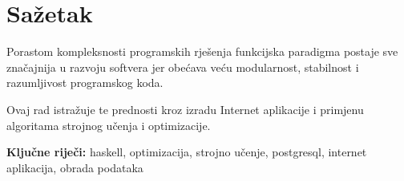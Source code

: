 \chapter*{Sažetak}
Porastom kompleksnosti programskih rješenja funkcijska paradigma postaje sve značajnija u razvoju softvera jer obećava veću modularnost, stabilnost i razumljivost programskog koda.

Ovaj rad istražuje te prednosti kroz izradu Internet aplikacije i primjenu algoritama strojnog učenja i optimizacije.

\textbf{Ključne riječi:} haskell, optimizacija, strojno učenje, postgresql, internet aplikacija, obrada podataka